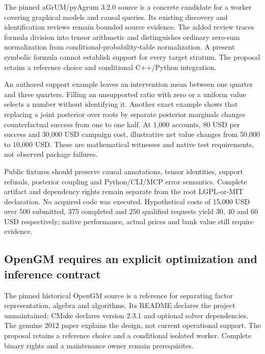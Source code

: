 The pinned aGrUM/pyAgrum 3.2.0 source is a concrete candidate for a
worker covering graphical models and causal queries. Its existing
discovery and identification reviews remain bounded source evidence. The
added review traces formula division into tensor arithmetic and
distinguishes ordinary zero-sum normalization from
conditional-probability-table normalization. A present symbolic formula
cannot establish support for every target stratum. The proposal retains
a reference choice and conditional C++/Python integration.
\citep{exec24_agrum_source,exec24_agrum_choice}

An authored support example leaves an intervention mean between one
quarter and three quarters. Filling an unsupported ratio with zero or a
uniform value selects a number without identifying it. Another exact
example shows that replacing a joint posterior over roots by separate
posterior marginals changes counterfactual success from one to one half.
At 1,000 accounts, 80 USD per success and 30,000 USD campaign cost,
illustrative net value changes from 50,000 to 10,000 USD. These are
mathematical witnesses and native test requirements, not observed
package failures. \citep{exec24_agrum_choice}

Public fixtures should preserve causal annotations, tensor identities,
support refusals, posterior coupling and Python/CLI/MCP error semantics.
Complete artifact and dependency rights remain separate from the root
LGPL-or-MIT declaration. No acquired code was executed. Hypothetical
costs of 15,000 USD over 500 submitted, 375 completed and 250 qualified
requests yield 30, 40 and 60 USD respectively; native performance,
actual prices and bank value still require evidence.
\citep{exec24_agrum_source,exec24_agrum_choice}

\hypertarget{opengm-requires-an-explicit-optimization-and-inference-contract}{%
\subsection{OpenGM requires an explicit optimization and inference
contract}\label{opengm-requires-an-explicit-optimization-and-inference-contract}}

The pinned historical OpenGM source is a reference for separating factor
representation, algebra and algorithms. Its README declares the project
unmaintained; CMake declares version 2.3.1 and optional solver
dependencies. The genuine 2012 paper explains the design, not current
operational support. The proposal retains a reference choice and a
conditional isolated worker. Complete binary rights and a maintenance
owner remain prerequisites.
\citep{exec24_opengm_source,exec24_opengm_paper,exec24_opengm_choice}

